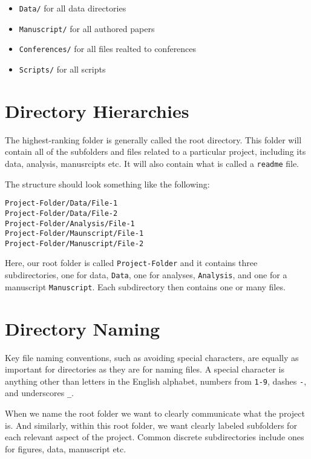 \documentclass[
]{book}
\providecommand{\tightlist}{%
  \setlength{\itemsep}{0pt}\setlength{\parskip}{0pt}}
\begin{document}
\begin{itemize}
\tightlist
\item
  \texttt{Data/} for all data directories
\item
  \texttt{Manuscript/} for all authored papers
\item
  \texttt{Conferences/} for all files realted to conferences
\item
  \texttt{Scripts/} for all scripts
\end{itemize}

\hypertarget{directory-hierarchies}{%
\section*{Directory Hierarchies}\label{directory-hierarchies}}

The highest-ranking folder is generally called the root directory. This folder will contain all of the subfolders and files related to a particular project, including its data, analysis, manusrcipts etc. It will also contain what is called a \texttt{readme} file.

The structure should look something like the following:

\begin{verbatim}
Project-Folder/Data/File-1
Project-Folder/Data/File-2
Project-Folder/Analysis/File-1
Project-Folder/Maunscript/File-1
Project-Folder/Manuscript/File-2
\end{verbatim}

Here, our root folder is called \texttt{Project-Folder} and it contains three subdirectories, one for data, \texttt{Data}, one for analyses, \texttt{Analysis}, and one for a manuscript \texttt{Manuscript}. Each subdirectory then contains one or many files.

\hypertarget{directory-naming}{%
\section*{Directory Naming}\label{directory-naming}}

Key file naming conventions, such as avoiding special characters, are equally as important for directories as they are for naming files. A special character is anything other than letters in the English alphabet, numbers from \texttt{1-9}, dashes \texttt{-}, and underscores \texttt{\_}.

When we name the root folder we want to clearly communicate what the project is. And similarly, within this root folder, we want clearly labeled subfolders for each relevant aspect of the project. Common discrete subdirectories include ones for figures, data, manuscript etc.
\end{document}
